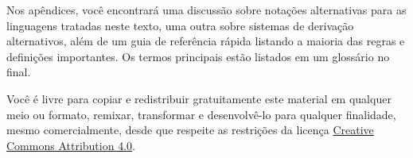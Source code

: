 Nos apêndices, você encontrará uma discussão sobre notações alternativas para as linguagens tratadas neste texto, uma outra sobre sistemas de derivação alternativos, além  de um guia de referência rápida listando a maioria das regras e definições importantes.
Os termos principais estão listados em um glossário no final.

Você é livre para copiar e redistribuir gratuitamente este material em qualquer meio ou formato, remixar, transformar e desenvolvê-lo para qualquer finalidade, mesmo comercialmente, desde que respeite as restrições da licença  \href{https://creativecommons.org/licenses/by/4.0/}{Creative Commons Attribution 4.0}.
